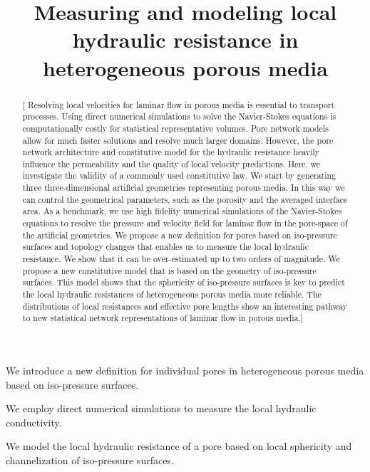 \documentclass[draft]{agujournal2019}
\begin{document}
\title{Measuring and modeling local hydraulic resistance in heterogeneous porous media}











\begin{keypoints}
\item We introduce a new definition for individual pores in heterogeneous porous media based on iso-pressure surfaces.
\item We employ direct numerical simulations to measure the local hydraulic conductivity. 
\item We model the local hydraulic resistance of a pore based on local sphericity and channelization of iso-pressure surfaces. 
\end{keypoints}


\begin{abstract}
[ Resolving local velocities for laminar flow in porous media is essential to transport processes. Using direct numerical simulations to solve the Navier-Stokes equations is computationally costly for statistical representative volumes. Pore network models allow for much faster solutions and resolve much larger domains. However, the pore network architecture and constitutive model for the hydraulic resistance heavily influence the permeability and the quality of local velocity predictions. Here, we investigate the validity of a commonly used constitutive law. We start by generating three three-dimensional artificial geometries representing porous media. In this way we can control the geometrical parameters, such as the porosity and the averaged interface area. As a benchmark, we use high fidelity numerical simulations of the Navier-Stokes equations to resolve the pressure and velocity field for laminar flow in the pore-space of the artificial geometries. We propose a new definition for pores based on iso-pressure surfaces and topology changes that enables us to measure the local hydraulic resistance. We show that it can be over-estimated up to two orders of magnitude. We propose a new constitutive model that is based on the geometry of iso-pressure surfaces. This model shows that the sphericity of iso-pressure surfaces is key to predict the local hydraulic resistances of heterogeneous porous media more reliable. The distributions of local resistances and effective pore lengths show an interesting pathway to new statistical network representations of laminar flow in porous media.]
\end{abstract}
\end{document}
